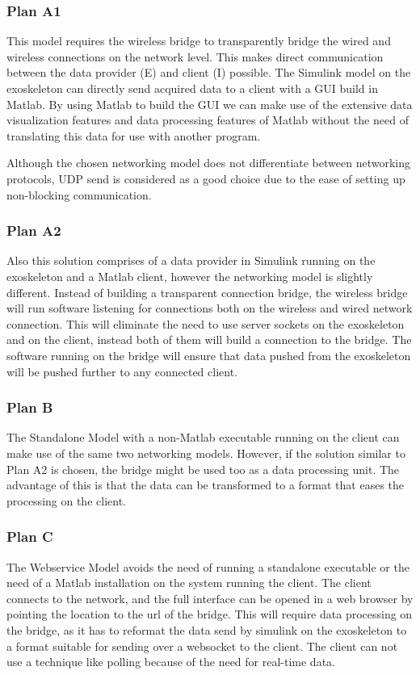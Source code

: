 \subsubsection{Plan A1}
This model requires the wireless bridge to transparently bridge the wired and wireless connections on the network level. This makes direct communication between the data provider (E) and client (I) possible. The Simulink model on the exoskeleton can directly send acquired data to a client with a GUI build in Matlab. By using Matlab to build the GUI we can make use of the extensive data visualization features and data processing features of Matlab without the need of translating this data for use with another program. 

Although the chosen networking model does not differentiate between networking protocols, UDP send \cite{web:UDPSend} is considered as a good choice due to the ease of setting up non-blocking communication.
\subsubsection{Plan A2}
Also this solution comprises of a data provider in Simulink running on the exoskeleton and a Matlab client, however the networking model is slightly different. Instead of building a transparent connection bridge, the wireless bridge will run software listening for connections both on the wireless and wired network connection. This will eliminate the need to use server sockets on the exoskeleton and on the client, instead both of them will build a connection to the bridge. The software running on the bridge will ensure that data pushed from the exoskeleton will be pushed further to any connected client.
\subsubsection{Plan B}
The Standalone Model with a non-Matlab executable running on the client can make use of the same two networking models. However, if the solution similar to Plan A2 is chosen, the bridge might be used too as a data processing unit. The advantage of this is that the data can be transformed to a format that eases the processing on the client.
\subsubsection{Plan C}
The Webservice Model avoids the need of running a standalone executable or the need of a Matlab installation on the system running the client. The client connects to the network, and the full interface can be opened in a web browser by pointing the location to the url of the bridge. This will require data processing on the bridge, as it has to reformat the data send by simulink on the exoskeleton to a format suitable for sending over a websocket to the client. The client can not use a technique like polling because of the need for real-time data.


